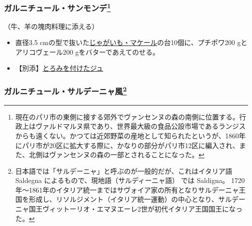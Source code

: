 \begin{recette}
\atoaki{}

\hypertarget{garniture-saint-mande}{%
\subsubsection[ガルニチュール・サンモンデ]{\texorpdfstring{ガルニチュール・サンモンデ\footnote{現在のパリ市の東側に接する郊外でヴァンセンヌの森の南側に位置する。行政上はヴァルドマルヌ県であり、世界最大級の食品公設市場であるランジスからも遠くない。かつては近郊野菜の産地として知られたというが、1860年にパリ市が20区に拡大する際に、かなりの部分がパリ市12区に編入され、また、北側はヴァンセンヌの森の一部とされることになった。}}{ガルニチュール・サンモンデ}}\label{garniture-saint-mande}}



（牛、羊の塊肉料理に添える）

\begin{itemize}
\item
  直径3.5
  cmの型で抜いた\protect\hyperlink{pommes-de-terre-macaire}{じゃがいも・マケール}の台10個に、プチポワ200
  gとアリコヴェール200 gをバターであえてのせる。
\item
  【別添】\protect\hyperlink{jus-de-veau-lie}{とろみを付けたジュ}
\end{itemize}

\atoaki{}

\hypertarget{garniture-sarde}{%
\subsubsection[ガルニチュール・サルデーニャ風]{\texorpdfstring{ガルニチュール・サルデーニャ風\footnote{日本語では「サルデーニャ」と呼ぶのが一般的だが、これはイタリア語
  Saldegna によるもので、現地語（サルディーニャ語） では Saldigna。
  1720年〜1861年のイタリア統一まではサヴォイア家の所有となりサルデーニャ王国を形成し、リソルジメント（イタリア統一運動）の中心となり、サルデーニャ国王ヴィットーリオ・エマヌエーレ2世が初代イタリア王国国王になった。}}{ガルニチュール・サルデーニャ風}}\label{garniture-sarde}}




\end{recette}
